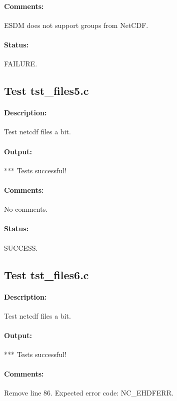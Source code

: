 \paragraph{Comments:} ESDM does not support groups from NetCDF.

\paragraph{Status:} FAILURE.

\subsection{Test tst\_files5.c}

\paragraph{Description:} Test netcdf files a bit.

\paragraph{Output:} *** Tests successful!

\paragraph{Comments:} No comments.

\paragraph{Status:} SUCCESS.

\subsection{Test tst\_files6.c}

\paragraph{Description:} Test netcdf files a bit.

\paragraph{Output:} *** Tests successful!

\paragraph{Comments:} Remove line 86. Expected error code: NC\_EHDFERR.

